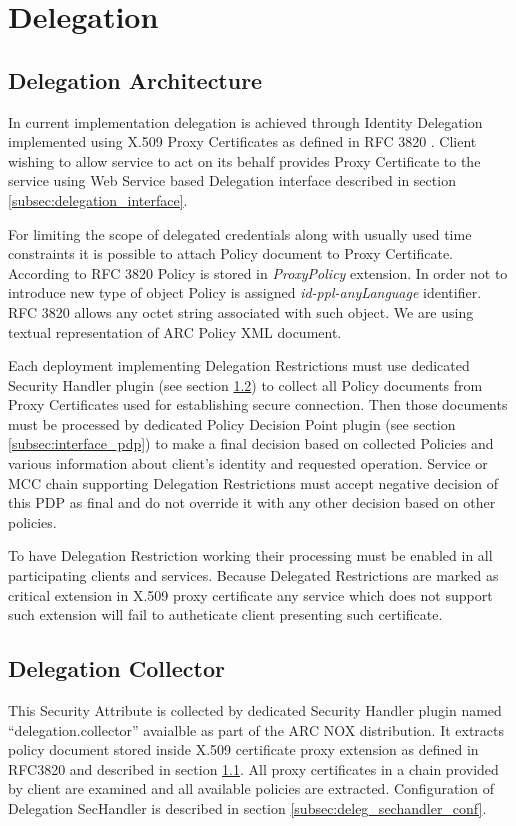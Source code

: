 \documentclass{article}                            %
\begin{document}



\section{Delegation} %
\label{sec:delegation}

\subsection{Delegation Architecture} %
\label{subsec:delegation_arch}
In current implementation delegation is achieved through Identity Delegation implemented using X.509 Proxy Certificates as defined in RFC 3820 \cite{x509proxy}. Client wishing to allow service to act on its behalf provides Proxy Certificate to the service using Web Service based Delegation interface described in section \ref{subsec:delegation_interface}.

For limiting the scope of delegated credentials along with usually used time constraints it is possible to attach Policy document to Proxy Certificate. According to RFC 3820 Policy is stored in \textit{ProxyPolicy} extension. In order not to introduce new type of object Policy is assigned \textit{id-ppl-anyLanguage} identifier. RFC 3820 allows any octet string associated with such object. We are using textual representation of ARC Policy XML document.

Each deployment implementing Delegation Restrictions must use dedicated Security Handler plugin (see section \ref{subsec:delegation_collector}) to collect all Policy documents from Proxy Certificates used for establishing secure connection. Then those documents must be processed by dedicated Policy Decision Point plugin (see section \ref{subsec:interface_pdp}) to make a final decision based on collected Policies and various information about client's identity and requested operation. Service or MCC chain supporting Delegation Restrictions must accept negative decision of this PDP as final and do not override it with any other decision based on other policies.

To have Delegation Restriction working their processing must be enabled in all participating clients and services. Because Delegated Restrictions are marked as critical extension in X.509 proxy certificate any  service which does not support such extension will fail to autheticate client presenting such certificate.

\subsection{Delegation Collector} %
\label{subsec:delegation_collector}
This Security Attribute is collected by dedicated Security Handler plugin named ``delegation.collector'' avaialble as part of the ARC NOX distribution. It extracts policy document stored inside X.509 certificate proxy extension as defined in RFC3820 and described in section \ref{subsec:delegation_arch}. All proxy certificates in a chain provided by client are examined and all available policies are extracted. Configuration of Delegation SecHandler is described in section \ref{subsec:deleg_sechandler_conf}.
\end{document}
